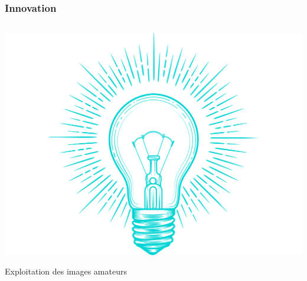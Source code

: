 \begin{frame}
	\frametitle{Innovation}
	\vspace{-0.8cm}
	\begin{columns}[T]
		\begin{block}{}
		\begin{minipage}{.1\textwidth}
		\vspace{-0.3cm}
		\includegraphics[scale=0.03]{Files/fig/innov2.png}
		\end{minipage}
		\hfill
		\begin{minipage}{0.8\textwidth}
		\centering\Large{Exploitation des images amateurs}
		\end{minipage}
		\end{block}
	\end{columns}
	\vspace{0.5cm}
	\centering
\end{frame}

